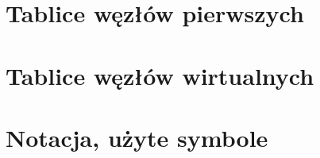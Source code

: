 \appendix
\chapter{Tablice węzłów pierwszych}


\chapter{Tablice węzłów wirtualnych}

\chapter{Notacja, użyte symbole}


